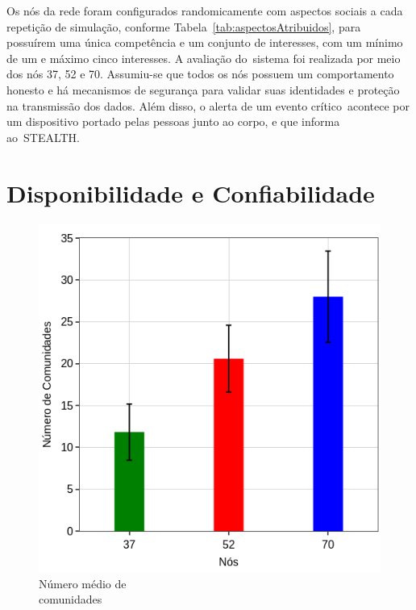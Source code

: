 \documentclass[12pt]{article}
\newcommand{\agn}[1]{\textcolor{auburn}{#1}}
\begin{document}
Os nós da rede foram configurados randomicamente com aspectos sociais a cada repetição de simulação, conforme Tabela~\ref{tab:aspectosAtribuidos},
\agn{para possuírem}
uma única competência e um conjunto de interesses, com um mínimo de um e máximo cinco interesses. A avaliação do~sistema foi realizada por meio dos nós 37, 52 e 70.
Assumiu-se que todos os nós possuem um comportamento honesto e há mecanismos de segurança para validar suas identidades e proteção na transmissão dos dados. Além disso, 
o alerta de um evento crítico~acontece por 
um dispositivo portado pelas pessoas junto ao 
corpo, e que informa ao~\mbox{STEALTH}.



\section{Disponibilidade e Confiabilidade} \label{sec:results}

\begin{figure}
\centering
\includegraphics[width=.35\textwidth]{figures/coi_mean_performance_3_SBSEG19_v2.png}
\vspace{-0.5cm}
\caption[Número médio de comunidades]
{Número médio de \\ comunidades\endtabular}
\label{fig:coiEstabelecidas}
\end{figure}    
\end{document}
